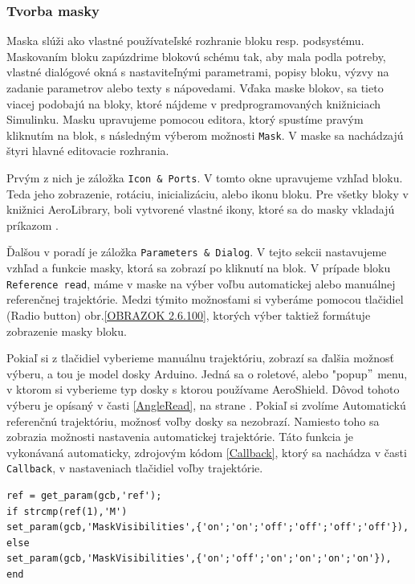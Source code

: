 \newpage
\subsubsection{Tvorba masky}
\label{Maska}

Maska slúži ako vlastné používateľské rozhranie bloku resp. podsystému. Maskovaním bloku zapúzdrime blokovú schému tak, aby mala podla potreby, vlastné dialógové okná s nastaviteľnými parametrami, popisy bloku, výzvy na zadanie parametrov alebo texty s nápovedami. Vďaka maske blokov, sa tieto viacej podobajú na bloky, ktoré nájdeme v predprogramovaných knižniciach Simulinku. Masku upravujeme pomocou editora, ktorý spustíme pravým kliknutím na blok, s následným výberom možnosti \verb|Mask|. V maske sa nachádzajú štyri hlavné editovacie rozhrania. 

Prvým z nich je záložka \verb|Icon & Ports|. V tomto okne upravujeme vzhľad bloku. Teda jeho zobrazenie, rotáciu, inicializáciu, alebo ikonu bloku. Pre všetky bloky v knižnici AeroLibrary, boli vytvorené vlastné ikony, ktoré sa do masky vkladajú príkazom .

Ďalšou v poradí je záložka \verb|Parameters & Dialog|. V tejto sekcii nastavujeme vzhľad a funkcie masky, ktorá sa zobrazí po kliknutí na blok. V prípade bloku \verb|Reference read|, máme v maske na výber voľbu automatickej alebo manuálnej referenčnej trajektórie. Medzi týmito možnosťami si vyberáme pomocou tlačidiel (Radio button) obr.\ref{OBRAZOK 2.6.100}, ktorých výber taktiež formátuje zobrazenie masky bloku. 

Pokiaľ si z tlačidiel vyberieme manuálnu trajektóriu, zobrazí sa ďalšia možnosť výberu, a tou je model dosky Arduino. Jedná sa o roletové, alebo "popup$"$ menu, v ktorom si vyberieme typ dosky s ktorou používame AeroShield. Dôvod tohoto výberu je opísaný v časti \ref{AngleRead}, na strane \pageref{AngleRead}. Pokiaľ si zvolíme Automatickú referenčnú trajektóriu, možnosť voľby dosky sa nezobrazí. Namiesto toho sa zobrazia možnosti nastavenia automatickej trajektórie. Táto funkcia je vykonávaná automaticky, zdrojovým kódom \ref{Callback}, ktorý sa nachádza v časti \verb|Callback|, v nastaveniach tlačidiel voľby trajektórie. 

\begin{lstlisting}[caption={Callback funkcia.},captionpos=b,label=Callback]
ref = get_param(gcb,'ref');
if strcmp(ref(1),'M')
set_param(gcb,'MaskVisibilities',{'on';'on';'off';'off';'off';'off'}),
else
set_param(gcb,'MaskVisibilities',{'on';'off';'on';'on';'on';'on'}),
end
\end{lstlisting}

